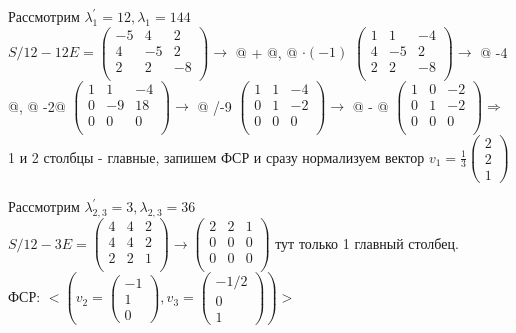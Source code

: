 \documentclass[a4paper,12pt]{article}
\makeatletter
\newcommand*{\rom}[1]{\expandafter\@slowromancap\romannumeral #1@}
\makeatother
\begin{document}
\begin{enumerate}
Рассмотрим $\lambda_1^{'}=12, \lambda_1=144$\\
$S/12-12E=\begin{pmatrix}
-5&4&2\\
4&-5&2\\
2&2&-8\\
\end{pmatrix} \rightarrow$ \rom{1} +  \rom{2}, \rom{2} $\cdot(-1)$ 
$\begin{pmatrix}
1&1&-4\\
4&-5&2\\
2&2&-8\\
\end{pmatrix} \rightarrow$ \rom{2} -4  \rom{1}, \rom{4} -2\rom{1}  
$\begin{pmatrix}
1&1&-4\\
0&-9&18\\
0&0&0\\
\end{pmatrix} \rightarrow$ \rom{2} /-9 
$\begin{pmatrix}
1&1&-4\\
0&1&-2\\
0&0&0\\
\end{pmatrix} \rightarrow$ \rom{1} - \rom{2} 
$\begin{pmatrix}
1&0&-2\\
0&1&-2\\
0&0&0\\
\end{pmatrix} \Rightarrow$ 1 и 2 столбцы - главные, запишем ФСР и сразу нормализуем вектор $v_1 = \frac{1}{3}\begin{pmatrix}
2\\
2\\
1
\end{pmatrix}$

Рассмотрим $\lambda_{2,3}^{'}=3, \lambda_{2,3}=36$\\
$S/12-3E=\begin{pmatrix}
4&4&2\\
4&4&2\\
2&2&1\\
\end{pmatrix} \rightarrow\begin{pmatrix}
2&2&1\\
0&0&0\\
0&0&0\\
\end{pmatrix}$ тут только 1 главный столбец.\\
ФСР: $<(v_2 =\begin{pmatrix}
-1\\
1\\
0
\end{pmatrix},v_3 =\begin{pmatrix}
-1/2\\
0\\
1
\end{pmatrix})>$


\end{enumerate}
\end{document}
